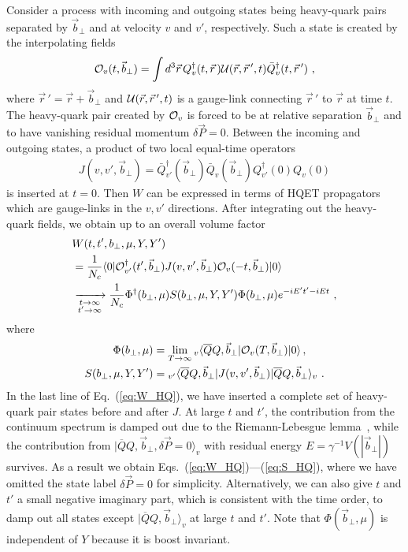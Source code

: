 Consider a process with incoming and outgoing states being heavy-quark pairs separated by ${\vec b}_\perp$ and at velocity $v$ and $v'$, respectively.
%
Such a state is created by the interpolating fields
\begin{align}
	{\cal O}_v(t,{\vec b}_\perp)=\int d^3\vec r \, Q_v^{\dagger}(t,\vec r\,) {\cal U}(\vec r,\vec r\,',t) \bar Q_v^{\dagger}(t,\vec r\,')  \ ,
\end{align}
where $\vec r\,'=\vec r+\vec b_\perp$ and ${\cal U}(\vec r,\vec r\,',t)$ is a gauge-link connecting $\vec r\,'$ to $\vec r$ at time $t$.
%
The heavy-quark pair created by ${\cal O}_v$ is forced to be at relative separation $\vec{b}_\perp$ and to have vanishing residual momentum $\delta \vec P=0$.
%
Between the incoming and outgoing states, a product of two local equal-time operators
\begin{align}
	J(v,v',\vec{b}_\perp)= \bar Q^\dagger_{v'}(\vec{b}_\perp)\bar Q_v(\vec{b}_\perp)Q_{v'}^\dagger(0)Q_v(0)
\end{align}
is inserted at $t=0$.
%
Then $W$ can be expressed in terms of HQET propagators which are gauge-links in the $v,v'$ directions.
%
After integrating out the heavy-quark fields, we obtain up to an overall volume factor~\cite{Ji:2019sxk}
\begin{align}\label{eq:W_HQ}
	&W(t,t',b_\perp,\mu,Y,Y')  \\
	&=\frac{1}{N_c} \langle0|{\cal O}^{\dagger}_{v'}(t',{\vec b}_\perp) J(v,v',\vec{b}_\perp) {\cal O}_v(-t,\vec{b}_\perp)|0\rangle \nonumber\\
	&\xrightarrow[\substack{t\to\infty\\t'\to\infty}]{} \frac{1}{N_c}\Phi^\dagger(b_\perp,\mu) S(b_\perp,\mu,Y,Y') \Phi(b_\perp,\mu)e^{-iE't'-iEt}  \ , \nonumber
\end{align}
where
\begin{align}\label{eq:S_HQ}
	\Phi(b_\perp,\mu)&=\lim_{T\to\infty}{}_v\langle \overline QQ,\vec{b}_\perp|{\cal O}_v(T,\vec{b}_\perp)|0\rangle\,,\\
	S(b_\perp,\mu,Y,Y')&={{}_{v'}}\langle\overline QQ,\vec{b}_\perp|J(v,v',\vec{b}_\perp)|\overline QQ,\vec{b}_\perp\rangle_v \ . \nonumber
\end{align}
%
In the last line of Eq.~(\ref{eq:W_HQ}), we have inserted a complete set of heavy-quark pair states before and after $J$.
%
At large $t$ and $t'$, the contribution from the continuum spectrum is damped out due to the Riemann-Lebesgue lemma~\cite{zuazo2001fourier}, while the contribution from $|\overline QQ,\vec{b}_\perp,\delta \vec{P}=0\rangle_v$ with residual energy $E=\gamma^{-1}V(|\vec b_\perp|)$ survives.
%
As a result we obtain Eqs.~(\ref{eq:W_HQ})---(\ref{eq:S_HQ}), where we have omitted the state label $\delta \vec{P}=0$ for simplicity.
%
Alternatively, we can also give $t$ and $t'$ a small negative imaginary part, which is consistent with the time order, to damp out all states except $|\overline QQ,\vec{b}_\perp\rangle_v$ at large $t$ and $t'$.
%
Note that $\Phi(\vec{b}_\perp,\mu)$ is independent of $Y$ because it is boost invariant.

